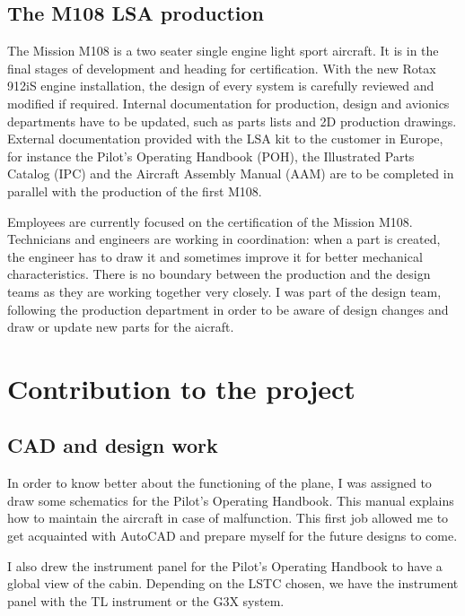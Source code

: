 \documentclass[11pt,a4paper]{article}
\begin{document}
\subsection{The M108 LSA production}
The Mission M108 is a two seater single engine light sport aircraft. It is in the final stages of development and heading for certification. With the new Rotax 912iS engine installation, the design of every system is carefully reviewed and modified if required. Internal documentation for production, design and avionics departments have to be updated, such as parts lists and 2D production drawings. External documentation provided with the LSA kit to the customer in Europe, for instance the Pilot's Operating Handbook (POH), the Illustrated Parts Catalog (IPC) and the Aircraft Assembly Manual (AAM) are to be completed in parallel with the production of the first M108.

\bigskip

Employees are currently focused on the certification of the Mission M108. Technicians and engineers are working in coordination: when a part is created, the engineer has to draw it and sometimes improve it for better mechanical characteristics. There is no boundary between the production and the design teams as they are working together very closely. I was part of the design team, following the production department in order to be aware of design changes and draw or update new parts for the aicraft.

\newpage

\section{Contribution to the project}
\subsection{CAD and design work}

In order to know better about the functioning of the plane, I was assigned to draw some schematics for the Pilot's Operating Handbook. This manual explains how to maintain the aircraft in case of malfunction. This first job allowed me to get acquainted with AutoCAD and prepare myself for the future designs to come. 


\bigskip

I also drew the instrument panel for the Pilot's Operating Handbook to have a global view of the cabin. Depending on the LSTC chosen, we have the instrument panel with the TL instrument or the G3X system.
\end{document}
